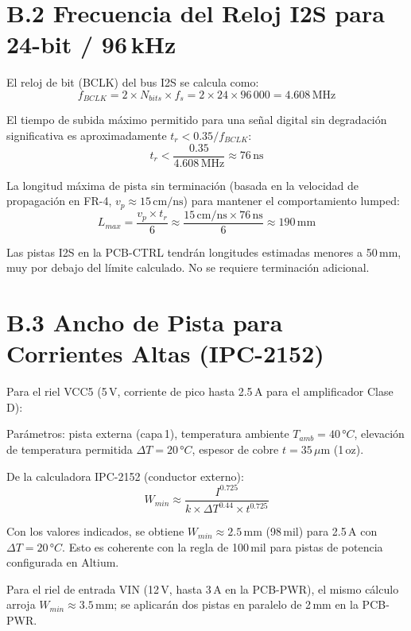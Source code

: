 \section*{B.2 Frecuencia del Reloj I2S para 24-bit / 96\,kHz}

El reloj de bit (BCLK) del bus I2S se calcula como:
\[
  f_{BCLK} = 2 \times N_{bits} \times f_s = 2 \times 24 \times 96\,000 = 4.608\,\text{MHz}
\]

El tiempo de subida máximo permitido para una señal digital sin degradación significativa es aproximadamente $t_r < 0.35/f_{BCLK}$:
\[
  t_r < \frac{0.35}{4.608\,\text{MHz}} \approx 76\,\text{ns}
\]

La longitud máxima de pista sin terminación (basada en la velocidad de propagación en FR-4, $v_p \approx 15\,\text{cm/ns}$) para mantener el comportamiento lumped:
\[
  L_{max} = \frac{v_p \times t_r}{6} \approx \frac{15\,\text{cm/ns} \times 76\,\text{ns}}{6} \approx 190\,\text{mm}
\]

Las pistas I2S en la PCB-CTRL tendrán longitudes estimadas menores a 50\,mm, muy por debajo del límite calculado. No se requiere terminación adicional.

\section*{B.3 Ancho de Pista para Corrientes Altas (IPC-2152)}

Para el riel VCC5 (5\,V, corriente de pico hasta 2.5\,A para el amplificador Clase D):

Parámetros: pista externa (capa\,1), temperatura ambiente $T_{amb} = 40\,°C$, elevación de temperatura permitida $\Delta T = 20\,°C$, espesor de cobre $t = 35\,\mu\text{m}$ (1\,oz).

De la calculadora IPC-2152 (conductor externo):
\[
  W_{min} \approx \frac{I^{0.725}}{k \times \Delta T^{0.44} \times t^{0.725}}
\]

Con los valores indicados, se obtiene $W_{min} \approx 2.5\,\text{mm}$ (98\,mil) para 2.5\,A con $\Delta T = 20\,°C$. Esto es coherente con la regla de 100\,mil para pistas de potencia configurada en Altium.

Para el riel de entrada VIN (12\,V, hasta 3\,A en la PCB-PWR), el mismo cálculo arroja $W_{min} \approx 3.5\,\text{mm}$; se aplicarán dos pistas en paralelo de 2\,mm en la PCB-PWR.

